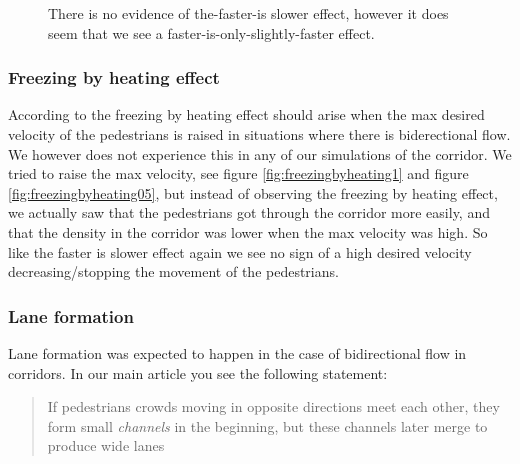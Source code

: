 \begin{figure}[h]
\caption{There is no evidence of the-faster-is slower effect, however it does seem that we see a faster-is-only-slightly-faster effect.}
\label{fig:isfasterslower}
\end{figure}

\subsubsection{Freezing by heating effect}
According to \cite{self-org} the freezing by heating effect should 
arise when the max desired velocity of the pedestrians is raised in 
situations where there is biderectional flow. We however does not 
experience this in any of our simulations of the corridor. We tried 
to raise the max velocity, see figure \ref{fig:freezingbyheating1} and 
figure \ref{fig:freezingbyheating05}, but instead of observing the 
freezing by heating effect, we actually saw that the pedestrians got 
through the corridor more easily, and that the density in the corridor 
was lower when the max velocity was high. So like the faster is slower 
effect again we see no sign of a high desired velocity decreasing/stopping 
the movement of the pedestrians. 

\subsubsection{Lane formation}
Lane formation was expected to happen in the case of bidirectional 
flow in corridors. In our main article you see the following statement:

\begin{quote}
If pedestrians crowds moving in opposite directions meet each other, 
they form small \emph{channels} in the beginning, but these channels 
later merge to produce wide lanes
\end{quote}

